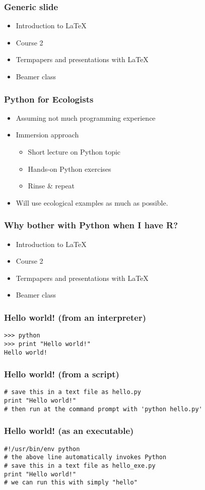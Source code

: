\documentclass{beamer}
\begin{document}
\begin{frame}[fragile]
\frametitle{Generic slide}
\begin{itemize}
\item Introduction to  \LaTeX  
\item Course 2 
\item Termpapers and presentations with \LaTeX 
\item Beamer class
\end{itemize} 
\end{frame}

\begin{frame}[fragile]
\frametitle{Python for Ecologists}
\begin{itemize}
  \item Assuming not much programming experience
  \item Immersion approach 
\begin{itemize}
  \item Short lecture on Python topic
  \item Hands-on Python exercises 
  \item Rinse \& repeat
\end{itemize}
  \item Will use ecological examples as much as possible.
\end{itemize} 
 
\end{frame}

\begin{frame}[fragile]
\frametitle{Why bother with Python when I have R?}
\begin{itemize}
\item Introduction to  \LaTeX  
\item Course 2 
\item Termpapers and presentations with \LaTeX 
\item Beamer class
\end{itemize} 
\end{frame}

\begin{frame}[fragile]
\frametitle{Hello world! (from an interpreter)}
\begin{lstlisting}
>>> python
>>> print "Hello world!"
Hello world!
\end{lstlisting}
\end{frame}

\begin{frame}[fragile]
\frametitle{Hello world! (from a script)}
\begin{lstlisting}
# save this in a text file as hello.py
print "Hello world!"
# then run at the command prompt with 'python hello.py'
\end{lstlisting}
\end{frame}

\begin{frame}[fragile]
\frametitle{Hello world! (as an executable)}
\begin{lstlisting}
#!/usr/bin/env python
# the above line automatically invokes Python
# save this in a text file as hello_exe.py
print "Hello world!"
# we can run this with simply "hello"
\end{lstlisting}
\end{frame}
\end{document}
